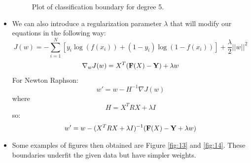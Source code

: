 \documentclass{article}
\begin{document}
\begin{itemize}
   \begin{figure}[H]
 \caption{Plot of classification boundary for degree 5.}
 \label{fig:12}
 \end{figure}
 
 \item We can also introduce a regularization parameter $\lambda$ that will modify our equations in the following way:
 $$J(w)=-\sum_{i=1}^N[y_i\log(f(x_i))+(1-y_i)\log(1-f(x_i))]+\frac \lambda 2||w||^2$$
 $$\nabla_wJ(w)=X^T({\bf F}(X)-{\bf Y})+\lambda w$$
For Newton Raphson:
 $$w' = w-H^{-1}\nabla J(w)$$
 where
 $$H=X^TRX+\lambda I$$
 so:
 $$w' = w - (X^TRX+\lambda I)^{-1}({\bf F}(X)-{\bf Y}+\lambda w)$$
 \item Some examples of figures then obtained are Figure \ref{fig:13} and \ref{fig:14}. These boundaries underfit the given data but have simpler weights.
 

\end{itemize}
\end{document}
